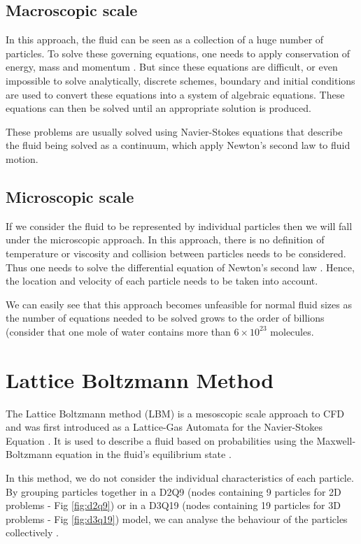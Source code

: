 \documentclass[12pt]{book}
\begin{document}
\subsection{Macroscopic scale}
In this approach, the fluid can be seen as a collection of a huge number of particles. To solve these governing equations, one needs to apply conservation of energy, mass and momentum \cite{lbm_springer}. But since these equations are difficult, or even impossible to solve analytically, discrete schemes, boundary and initial conditions are used to convert these equations into a system of algebraic equations. These equations can then be solved until an appropriate solution is produced. 
\par These problems are usually solved using Navier-Stokes equations that describe the fluid being solved as a continuum, which apply Newton's second law to fluid motion.

\subsection{Microscopic scale}
If we consider the fluid to be represented by individual particles then we will fall under the microscopic approach. In this approach, there is no definition of temperature or viscosity and collision between particles needs to be considered. Thus one needs to solve the differential equation of Newton’s second law \cite{lbm_springer}. Hence, the location and velocity of each particle needs to be taken into account.
	\par We can easily see that this approach becomes unfeasible for normal fluid sizes as the number of equations needed to be solved grows to the order of billions (consider that one mole of water contains more than $6 \times 10^{23}$ molecules.


\section{Lattice Boltzmann Method} \label{sec:lbmLit}
The Lattice Boltzmann method (LBM) is a mesoscopic scale approach to CFD and was first introduced as a Lattice-Gas Automata for the Navier-Stokes Equation \cite{gasautomata}. It is used to describe a fluid based on probabilities using the Maxwell-Boltzmann equation in the fluid’s equilibrium state \cite{lbm_springer}. 
\par In this method, we do not consider the individual characteristics of each particle. By grouping particles together in a D2Q9 (nodes containing 9 particles for 2D problems - Fig \ref{fig:d2q9})  or in a D3Q19 (nodes containing 19 particles for 3D problems - Fig \ref{fig:d3q19}) model, we can analyse the behaviour of the particles collectively  \cite{lbm_springer}. 
\end{document}
